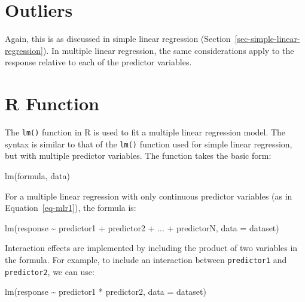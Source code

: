\documentclass[
  letterpaper,
]{book}
\newenvironment{Shaded}{\begin{snugshade}}{\end{snugshade}}
\newcommand{\AttributeTok}[1]{\textcolor[rgb]{0.40,0.45,0.13}{#1}}
\newcommand{\FunctionTok}[1]{\textcolor[rgb]{0.28,0.35,0.67}{#1}}
\newcommand{\NormalTok}[1]{\textcolor[rgb]{0.00,0.23,0.31}{#1}}
\newcommand{\SpecialCharTok}[1]{\textcolor[rgb]{0.37,0.37,0.37}{#1}}
\begin{document}
\section{Outliers}\label{outliers}

Again, this is as discussed in simple linear regression
(Section~\ref{sec-simple-linear-regression}). In multiple linear
regression, the same considerations apply to the response relative to
each of the predictor variables.

\section{R Function}\label{sec-r-function}

The \texttt{lm()} function in R is used to fit a multiple linear
regression model. The syntax is similar to that of the \texttt{lm()}
function used for simple linear regression, but with multiple predictor
variables. The function takes the basic form:

\begin{Shaded}
\begin{Highlighting}[]
\FunctionTok{lm}\NormalTok{(formula, data)}
\end{Highlighting}
\end{Shaded}

For a multiple linear regression with only continuous predictor
variables (as in Equation~\ref{eq-mlr1}), the formula is:

\begin{Shaded}
\begin{Highlighting}[]
\FunctionTok{lm}\NormalTok{(response }\SpecialCharTok{\textasciitilde{}}\NormalTok{ predictor1 }\SpecialCharTok{+}\NormalTok{ predictor2 }\SpecialCharTok{+}\NormalTok{ ... }\SpecialCharTok{+}\NormalTok{ predictorN,}
   \AttributeTok{data =}\NormalTok{ dataset)}
\end{Highlighting}
\end{Shaded}

Interaction effects are implemented by including the product of two
variables in the formula. For example, to include an interaction between
\texttt{predictor1} and \texttt{predictor2}, we can use:

\begin{Shaded}
\begin{Highlighting}[]
\FunctionTok{lm}\NormalTok{(response }\SpecialCharTok{\textasciitilde{}}\NormalTok{ predictor1 }\SpecialCharTok{*}\NormalTok{ predictor2, }\AttributeTok{data =}\NormalTok{ dataset)}
\end{Highlighting}
\end{Shaded}
\end{document}
